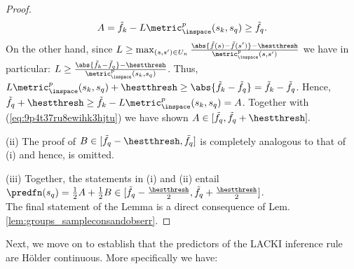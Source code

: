 \begin{lem}
\begin{proof}
\begin{equation}
A=\tilde f_k - L \metric_\inspace^p(s_k,s_q) \geq \tilde f_q. \label{eq:9p4t37ru8ewihk3hjtu}
\end{equation} 
On the other hand, since $L  \geq  \max_{(s,s') \in U_n} \frac{\abs{\tilde f(s)-\tilde f(s')} - \hestthresh}{\metric_\inspace^p(s,s')}$  we have in particular: $L  \geq  \frac{ \abs{\tilde f_k- \tilde f_q}-\hestthresh }{\metric_\inspace^p(s_k,s_q)}$. Thus,  
 $L \metric_\inspace^p(s_k,s_q) + \hestthresh \geq \abs{\tilde f_k-\tilde f_q} = \tilde f_k - \tilde f_q$. Hence, $\tilde f_q + \hestthresh \geq \tilde f_k - L \metric_\inspace^p(s_k,s_q) = A$. 
 Together with (\ref{eq:9p4t37ru8ewihk3hjtu}) we have shown $A \in [\tilde f_q , \tilde f_q +\hestthresh].$
% 

(ii) The proof of \underline{$B \in [ \tilde f_q - \hestthresh, \tilde f_q]$} is completely analogous to that of (i) and hence, is omitted.

(iii) Together, the statements in (i) and (ii)  entail  $\predfn(s_q) = \frac 1 2 A + \frac 1 2 B  \in [\tilde f_q - \frac \hestthresh 2, \tilde f_q + \frac \hestthresh 2]$.\\
The final statement of the Lemma is a direct consequence of Lem. \ref{lem:groups_sampleconsandobserr}. 
\end{proof}
\end{lem}

Next, we move on to establish that the predictors of the LACKI inference rule are H\"older continuous. More specifically we have:

